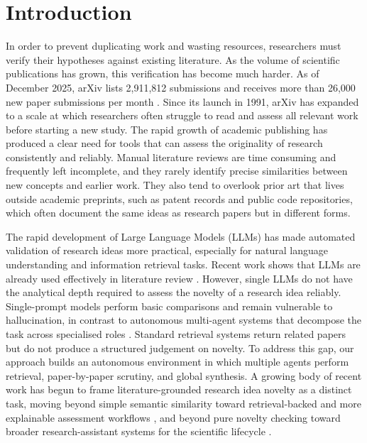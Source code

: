 \section{Introduction}
\label{sec:introduction}

In order to prevent duplicating work and wasting resources, researchers must verify their hypotheses against existing literature. As the volume of scientific publications has grown, this verification has become much harder. As of December 2025, arXiv lists 2,911,812 submissions and receives more than 26,000 new paper submissions per month \citep{arxivStats}. Since its launch in 1991, arXiv has expanded to a scale at which researchers often struggle to read and assess all relevant work before starting a new study. The rapid growth of academic publishing has produced a clear need for tools that can assess the originality of research consistently and reliably. Manual literature reviews are time consuming and frequently left incomplete, and they rarely identify precise similarities between new concepts and earlier work. They also tend to overlook prior art that lives outside academic preprints, such as patent records and public code repositories, which often document the same ideas as research papers but in different forms.

The rapid development of Large Language Models (LLMs) has made automated validation of research ideas more practical, especially for natural language understanding and information retrieval tasks. Recent work shows that LLMs are already used effectively in literature review \citep{eger2025}. However, single LLMs do not have the analytical depth required to assess the novelty of a research idea reliably. Single-prompt models perform basic comparisons and remain vulnerable to hallucination, in contrast to autonomous multi-agent systems that decompose the task across specialised roles \citep{zheng2025}. Standard retrieval systems return related papers but do not produce a structured judgement on novelty. To address this gap, our approach builds an autonomous environment in which multiple agents perform retrieval, paper-by-paper scrutiny, and global synthesis. A growing body of recent work has begun to frame literature-grounded research idea novelty as a distinct task, moving beyond simple semantic similarity toward retrieval-backed and more explainable assessment workflows \citep{shahid2025,lin2025schnovel,scholareval,rinobench,opennovelty,dasilva2025graphmind}, and beyond pure novelty checking toward broader research-assistant systems for the scientific lifecycle \citep{wang2024scimon,si2024llmideas,lu2024aiscientist,baek2024researchagent}.

